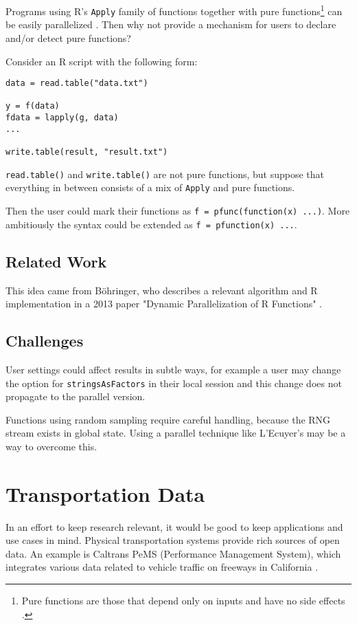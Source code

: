 \documentclass[12pt]{article}
\begin{document}
Programs using R's \texttt{Apply} family of functions together with pure
functions\footnote{Pure functions are those that depend only on inputs and
have no side effects \cite{wiki:purefunc}.} can be easily parallelized
\cite{bohringer2013dynamic}. Then why not provide a mechanism for users to
declare and/or detect pure functions?

Consider an R script with the following form:
\begin{verbatim}
data = read.table("data.txt")

y = f(data)
fdata = lapply(g, data)
...

write.table(result, "result.txt")
\end{verbatim}

\texttt{read.table()} and \texttt{write.table()} are not pure functions,
but suppose that everything in between consists of a mix of \texttt{Apply} and pure functions.

Then the user could mark their functions as \texttt{f = pfunc(function(x)
{...})}. More ambitiously the syntax could be extended as \texttt{f =
pfunction(x) {...}}.

\subsection{Related Work}

This idea came from Böhringer, who describes a relevant algorithm and
R implementation in a 2013 paper "Dynamic Parallelization of R Functions"
\cite{bohringer2013dynamic}.

\subsection{Challenges}

User settings could affect results in subtle ways, for example a user may
change the option for \texttt{stringsAsFactors} in their local session and
this change does not propagate to the parallel version.

Functions using random sampling require careful handling, because the RNG
stream exists in global state. Using a parallel technique like L'Ecuyer's
may be a way to overcome this.

\section{Transportation Data}

In an effort to keep research relevant, it would be good to keep
applications and use cases in mind. Physical transportation systems provide
rich sources of open data. An example is Caltrans PeMS (Performance
Management System), which integrates various data related to vehicle
traffic on freeways in California \cite{jia2001pems}.
\end{document}
